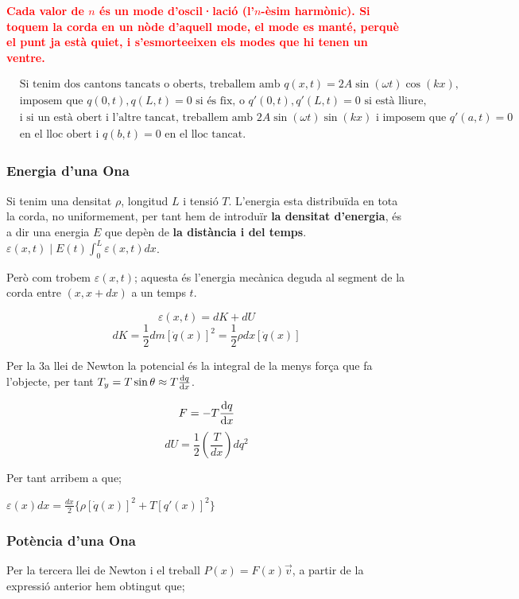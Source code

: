 \documentclass[12pt]{article}
\begin{document}
\textcolor{red}{\textbf{Cada valor de $n$ és un mode d'oscil·lació (l'$n$-èsim harmònic). Si toquem la corda en un nòde d'aquell mode, el mode es manté, perquè el punt ja està quiet, i s'esmorteeixen els modes que hi tenen un ventre.}}

\[
\boxed{
\begin{aligned}
&\text{Si tenim dos cantons tancats o oberts, treballem amb } q(x,t)=2A\sin(\omega t)\cos(kx),\\
&\text{imposem que } q(0,t), q(L,t)=0 \text{ si és fix, o } q'(0,t), q'(L,t)=0 \text{ si està lliure,}\\
&\text{i si un està obert i l'altre tancat, treballem amb } 2A\sin(\omega t)\sin(kx) \text{ i imposem que } q'(a,t)=0\\
&\text{en el lloc obert i } q(b,t)=0 \text{ en el lloc tancat.}
\end{aligned}
}
\]

\subsubsection{Energia d'una Ona}

Si tenim una densitat $\rho$, longitud $L$ i tensió $T$. L'energia esta distribuïda en tota la corda, no uniformement, per tant hem de introduïr \textbf{la densitat d'energia}, és a dir una energia $E$ que depèn de \textbf{la distància i del temps}. $\varepsilon(x,t) \mid E(t) \int_{0}^{L} \varepsilon(x,t) dx$.

Però com trobem $\varepsilon(x,t)$; aquesta és l'energia mecànica deguda al segment de la corda entre $(x,x+dx)$ a un temps $t$.

\[\varepsilon(x,t) = dK + dU\]
\[dK = \frac{1}{2}dm[\dot{q}(x)]^2 = \frac{1}{2}\rho dx [\dot{q}(x)]\]

Per la 3a llei de Newton la potencial és la integral de la menys força que fa l'objecte, per tant $T_y = T\sin\theta \approx T \dv{q}{x} (\text{pendent})$.

\[F = - T \dv{q}{x}\]
\[dU = \frac{1}{2} (\frac{T}{dx})dq^2\]

Per tant arribem a que;

$\varepsilon(x) dx = \frac{dx}{2}\{\rho[\dot{q}(x)]^2 + T [q'(x)]^2\}$

\subsubsection{Potència d'una Ona}

Per la tercera llei de Newton i el treball $P(x) = F(x)\vec{v}$, a partir de la expressió anterior hem obtingut que;
\end{document}
